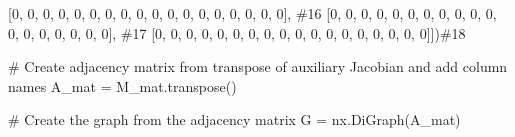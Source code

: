 \documentclass[
  letterpaper,
  DIV=11,
  numbers=noendperiod]{scrreprt}
\newenvironment{Shaded}{\begin{snugshade}}{\end{snugshade}}
\newcommand{\CommentTok}[1]{\textcolor[rgb]{0.37,0.37,0.37}{#1}}
\newcommand{\DecValTok}[1]{\textcolor[rgb]{0.68,0.00,0.00}{#1}}
\newcommand{\NormalTok}[1]{\textcolor[rgb]{0.00,0.23,0.31}{#1}}
\newcommand{\OperatorTok}[1]{\textcolor[rgb]{0.37,0.37,0.37}{#1}}
\begin{document}
\begin{tcolorbox}
\begin{Shaded}
\begin{Highlighting}[]
\NormalTok{                    [}\DecValTok{0}\NormalTok{, }\DecValTok{0}\NormalTok{, }\DecValTok{0}\NormalTok{, }\DecValTok{0}\NormalTok{, }\DecValTok{0}\NormalTok{, }\DecValTok{0}\NormalTok{, }\DecValTok{0}\NormalTok{, }\DecValTok{0}\NormalTok{, }\DecValTok{0}\NormalTok{, }\DecValTok{0}\NormalTok{, }\DecValTok{0}\NormalTok{, }\DecValTok{0}\NormalTok{, }\DecValTok{0}\NormalTok{, }\DecValTok{0}\NormalTok{, }\DecValTok{0}\NormalTok{, }\DecValTok{0}\NormalTok{, }\DecValTok{0}\NormalTok{, }\DecValTok{0}\NormalTok{], }\CommentTok{\#16}
\NormalTok{                    [}\DecValTok{0}\NormalTok{, }\DecValTok{0}\NormalTok{, }\DecValTok{0}\NormalTok{, }\DecValTok{0}\NormalTok{, }\DecValTok{0}\NormalTok{, }\DecValTok{0}\NormalTok{, }\DecValTok{0}\NormalTok{, }\DecValTok{0}\NormalTok{, }\DecValTok{0}\NormalTok{, }\DecValTok{0}\NormalTok{, }\DecValTok{0}\NormalTok{, }\DecValTok{0}\NormalTok{, }\DecValTok{0}\NormalTok{, }\DecValTok{0}\NormalTok{, }\DecValTok{0}\NormalTok{, }\DecValTok{0}\NormalTok{, }\DecValTok{0}\NormalTok{, }\DecValTok{0}\NormalTok{], }\CommentTok{\#17}
\NormalTok{                    [}\DecValTok{0}\NormalTok{, }\DecValTok{0}\NormalTok{, }\DecValTok{0}\NormalTok{, }\DecValTok{0}\NormalTok{, }\DecValTok{0}\NormalTok{, }\DecValTok{0}\NormalTok{, }\DecValTok{0}\NormalTok{, }\DecValTok{0}\NormalTok{, }\DecValTok{0}\NormalTok{, }\DecValTok{0}\NormalTok{, }\DecValTok{0}\NormalTok{, }\DecValTok{0}\NormalTok{, }\DecValTok{0}\NormalTok{, }\DecValTok{0}\NormalTok{, }\DecValTok{0}\NormalTok{, }\DecValTok{0}\NormalTok{, }\DecValTok{0}\NormalTok{, }\DecValTok{0}\NormalTok{]])}\CommentTok{\#18}

\CommentTok{\# Create adjacency matrix from transpose of auxiliary Jacobian and add column names}
\NormalTok{A\_mat }\OperatorTok{=}\NormalTok{ M\_mat.transpose()}

\CommentTok{\# Create the graph from the adjacency matrix}
\NormalTok{G }\OperatorTok{=}\NormalTok{ nx.DiGraph(A\_mat)}


\end{Highlighting}
\end{Shaded}
\end{tcolorbox}
\end{document}
